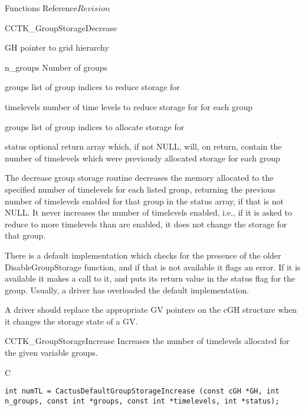 \begin{cactuspart}{ Functions Reference}{}{$Revision$}
\begin{FunctionDescription}{CCTK\_GroupStorageDecrease}
\begin{ParameterSection}
\begin{Parameter}{GH}
pointer to grid hierarchy
\end{Parameter}
\begin{Parameter}{n\_groups}
Number of groups
\end{Parameter}
\begin{Parameter}{groups}
list of group indices to reduce storage for
\end{Parameter}
\begin{Parameter}{timelevels}
number of time levels to reduce storage for for each group
\end{Parameter}
\begin{Parameter}{groups}
list of group indices to allocate storage for
\end{Parameter}
\begin{Parameter}{status}
  optional return array which, if not NULL, will, on return, contain
  the number of timelevels which were previously allocated storage for
  each group
\end{Parameter}
\end{ParameterSection}

\begin{Discussion}
  The decrease group storage routine decreases the memory allocated to
  the specified number of timelevels for each listed group, returning
  the previous number of timelevels enabled for that group in the
  status array, if that is not NULL.  It never increases the number of
  timelevels enabled, i.e., if it is asked to reduce to more
  timelevels than are enabled, it does not change the storage for that
  group.

  There is a default implementation which checks for the presence of
  the older DisableGroupStorage function, and if that is not available
  it flags an error.  If it is available it makes a call to it, and
  puts its return value in the status flag for the group.  Usually, a
  driver has overloaded the default implementation.

  A driver should replace the appropriate GV pointers on the cGH
  structure when it changes the storage state of a GV.
\end{Discussion}
\end{FunctionDescription}


\begin{FunctionDescription}{CCTK\_GroupStorageIncrease}
\label{CCTK-GroupStorageIncrease}
Increases the number of timelevels allocated for the given variable groups.
\begin{SynopsisSection}
\begin{Synopsis}{C}
\begin{verbatim}int numTL = CactusDefaultGroupStorageIncrease (const cGH *GH, int n_groups, const int *groups, const int *timelevels, int *status);\end{verbatim}
\end{Synopsis}
\end{SynopsisSection}


\end{FunctionDescription}
\end{cactuspart}
